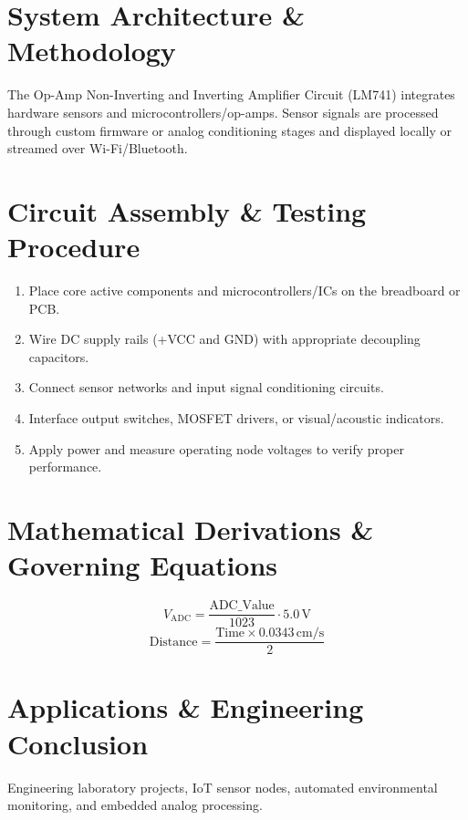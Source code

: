 \documentclass[11pt,a4paper]{article}
\begin{document}
\section{System Architecture \& Methodology}
The Op-Amp Non-Inverting and Inverting Amplifier Circuit (LM741) integrates hardware sensors and microcontrollers/op-amps. Sensor signals are processed through custom firmware or analog conditioning stages and displayed locally or streamed over Wi-Fi/Bluetooth.

\section{Circuit Assembly \& Testing Procedure}
\begin{enumerate}
    \item Place core active components and microcontrollers/ICs on the breadboard or PCB.
    \item Wire DC supply rails (+VCC and GND) with appropriate decoupling capacitors.
    \item Connect sensor networks and input signal conditioning circuits.
    \item Interface output switches, MOSFET drivers, or visual/acoustic indicators.
    \item Apply power and measure operating node voltages to verify proper performance.
\end{enumerate}

\section{Mathematical Derivations \& Governing Equations}
\begin{equation}
V_{\text{ADC}} = \frac{\text{ADC\_Value}}{1023} \cdot 5.0\,\text{V}
\end{equation}
\begin{equation}
\text{Distance} = \frac{\text{Time} \times 0.0343\,\text{cm/s}}{2}
\end{equation}

\section{Applications \& Engineering Conclusion}
Engineering laboratory projects, IoT sensor nodes, automated environmental monitoring, and embedded analog processing.
\end{document}

